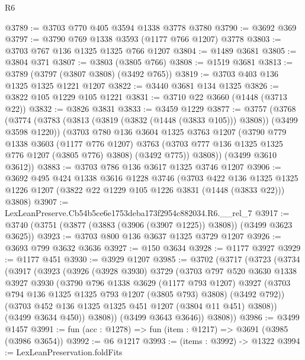 \begin{lexlean}{R6}
\begin{coremodule}
@3789 := @3703 @770 @405 @3594 @1338 @3778 @3780
@3790 := @3692 @369
@3797 := @3790 @769 @1338 @3593 (@1177 @766 @1207) @3778
@3803 := @3703 @767 @136 @1325 @1325 @766 @1207
@3804 := @1489 @3681
@3805 := @3804 @371
@3807 := @3803 (@3805 @766)
@3808 := @1519 @3681
@3813 := @3789 (@3797 (@3807 @3808) (@3492 @765))
@3819 := @3703 @403 @136 @1325 @1325 @1221 @1207
@3822 := @3440 @3681 @134 @1325
@3826 := @3822 @105 @1229 @105 @1221
@3831 := @3710 @22 @3660 (@1448 (@3713 @22))
@3832 := @3826 @3831
@3833 := @3459 @1229
@3877 := @3757
    (@3768
      (@3774
        (@3783 (@3813 (@3819 (@3832 (@1448 (@3833 @105))) @3808)) (@3499 @3598 @1220))
        (@3703
          @780
          @136
          @3604
          @1325
          @3763
          @1207
          (@3790
            @779
            @1338
            @3603
            (@1177 @776 @1207)
            @3763
            (@3703 @777 @136 @1325 @1325 @776 @1207 (@3805 @776) @3808)
            (@3492 @775))
          @3808))
      (@3499 @3610 @3612))
@3883 := @3703 @786 @136 @3617 @1325 @3746 @1207
@3906 := @3692
    @495
    @424
    @1338
    @3616
    @1228
    @3746
    (@3703
      @422
      @136
      @1325
      @1325
      @1226
      @1207
      (@3822 @22 @1229 @105 @1226 @3831 (@1448 (@3833 @22)))
      @3808)
@3907 := LexLeanPreserve.Cb54b5ce6e1753deba173f2954c882034.R6.__rel_7
@3917 := @3740 (@3751 (@3877 (@3883 (@3906 (@3907 @1225)) @3808)) (@3499 @3623 @3625))
@3923 := @3703 @800 @136 @3637 @1325 @3729 @1207
@3926 := @3693 @799 @3632 @3636
@3927 := @150 @3634
@3928 := @1177 @3927
@3929 := @1177 @451
@3930 := @3929 @1207
@3985 := @3702
    (@3717
      (@3723
        (@3734
          (@3917
            (@3923
              (@3926
                (@3928 @3930)
                @3729
                (@3703
                  @797
                  @520
                  @3630
                  @1338
                  @3927
                  @3930
                  (@3790
                    @796
                    @1338
                    @3629
                    (@1177 @793 @1207)
                    @3927
                    (@3703 @794 @136 @1325 @1325 @793 @1207 (@3805 @793) @3808)
                    (@3492 @792))
                  (@3703 @452 @136 @1325 @1325 @451 @1207 (@3804 @11 @451) @3808))
                (@3499 @3634 @450))
              @3808))
          (@3499 @3643 @3646))
        @3808))
@3986 := @3499 @1457
@3991 := fun (acc : @1278) => fun (item : @1217) => @3691 (@3985 (@3986 @3654))
@3992 := @6 @1217
@3993 := (items : @3992) -> @1322
@3994 := LexLeanPreservation.foldFits

\end{coremodule}
\end{lexlean}
